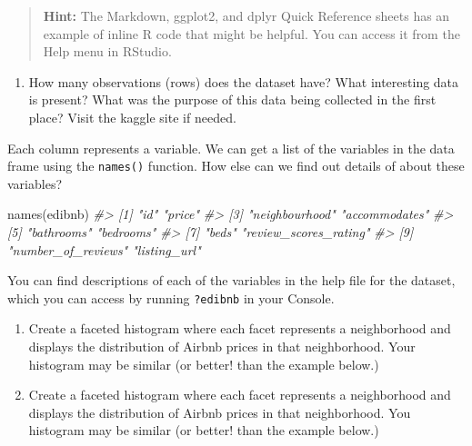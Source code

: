 \documentclass[
]{book}
\newenvironment{Shaded}{\begin{snugshade}}{\end{snugshade}}
\newcommand{\CommentTok}[1]{\textcolor[rgb]{0.56,0.35,0.01}{\textit{#1}}}
\newcommand{\FunctionTok}[1]{\textcolor[rgb]{0.00,0.00,0.00}{#1}}
\newcommand{\NormalTok}[1]{#1}
\providecommand{\tightlist}{%
  \setlength{\itemsep}{0pt}\setlength{\parskip}{0pt}}
\begin{document}
\begin{quote}
\textbf{Hint:} The Markdown, ggplot2, and dplyr Quick Reference sheets has an example of inline R code that might be helpful. You can access it from the Help menu in RStudio.
\end{quote}

\begin{enumerate}
\def\labelenumi{\arabic{enumi}.}
\setcounter{enumi}{2}
\tightlist
\item
  How many observations (rows) does the dataset have? What interesting data is present? What was the purpose of this data being collected in the first place? Visit the kaggle site if needed.
\end{enumerate}

Each column represents a variable. We can get a list of the variables in the data frame using the \texttt{names()} function. How else can we find out details of about these variables?

\begin{Shaded}
\begin{Highlighting}[]
\FunctionTok{names}\NormalTok{(edibnb)}
\CommentTok{\#\textgreater{}  [1] "id"                   "price"               }
\CommentTok{\#\textgreater{}  [3] "neighbourhood"        "accommodates"        }
\CommentTok{\#\textgreater{}  [5] "bathrooms"            "bedrooms"            }
\CommentTok{\#\textgreater{}  [7] "beds"                 "review\_scores\_rating"}
\CommentTok{\#\textgreater{}  [9] "number\_of\_reviews"    "listing\_url"}
\end{Highlighting}
\end{Shaded}

You can find descriptions of each of the variables in the help file for the dataset, which you can access by running \texttt{?edibnb} in your Console.

\begin{enumerate}
\def\labelenumi{\arabic{enumi}.}
\setcounter{enumi}{3}
\item
  Create a faceted histogram where each facet represents a neighborhood and displays the distribution of Airbnb prices in that neighborhood. Your histogram may be similar (or better! than the example below.)
\item
  Create a faceted histogram where each facet represents a neighborhood and displays the distribution of Airbnb prices in that neighborhood. You histogram may be similar (or better! than the example below.)
\end{enumerate}
\end{document}
